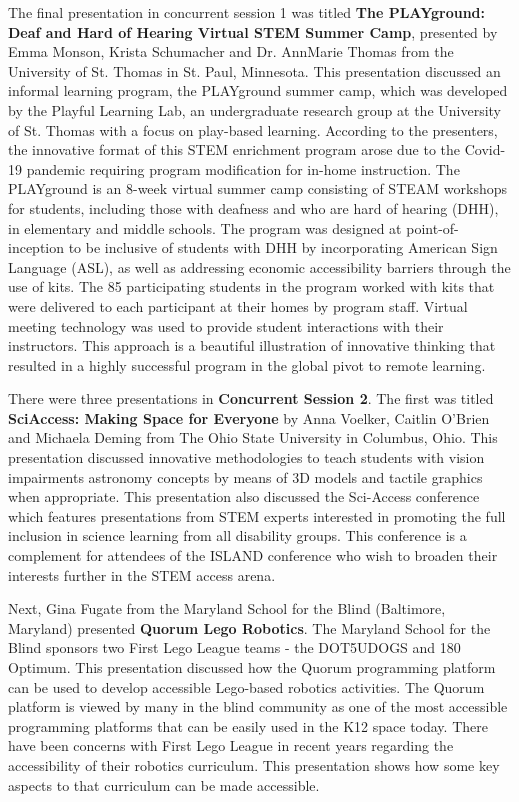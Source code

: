 \documentclass[11.5pt]{sig-alternate}
\begin{document}
\begin{large}
The final presentation in concurrent session 1 was titled \textbf{The PLAYground: Deaf and Hard of Hearing Virtual STEM Summer Camp}, presented by Emma Monson, Krista Schumacher and Dr. AnnMarie Thomas from the University of St. Thomas in St. Paul, Minnesota. This presentation discussed an informal learning program, the PLAYground summer camp, which was developed by the Playful Learning Lab, an undergraduate research group at the University of St. Thomas with a focus on play-based learning. According to the presenters, the innovative format of this STEM enrichment program arose due to the Covid-19 pandemic requiring program modification for in-home instruction. The PLAYground is an 8-week virtual summer camp consisting of STEAM workshops for students, including those with deafness and who are hard of hearing (DHH), in elementary and middle schools. The program was designed at point-of-inception to be inclusive of students with DHH by incorporating American Sign Language (ASL), as well as addressing economic accessibility barriers through the use of kits. The 85 participating students in the program worked with kits that were delivered to each participant at their homes by program staff. Virtual meeting technology was used to provide student interactions with their instructors. This approach is a beautiful illustration of innovative thinking that resulted in a highly successful program in the global pivot to remote learning. 

There were three presentations in \textbf{Concurrent Session 2}. The first was titled \textbf{SciAccess: Making Space for Everyone} by Anna Voelker, Caitlin O’Brien and Michaela Deming from The Ohio State University in Columbus, Ohio. This presentation discussed innovative methodologies to teach students with vision impairments astronomy concepts by means of 3D models and tactile graphics when appropriate. This presentation also discussed the Sci-Access conference which features presentations from STEM experts interested in promoting the full inclusion in science learning from all disability groups. This conference is a complement for attendees of the ISLAND conference who wish to broaden their interests further in the STEM access arena.

Next, Gina Fugate from the Maryland School for the Blind (Baltimore, Maryland) presented \textbf{Quorum Lego Robotics}. The Maryland School for the Blind sponsors two First Lego League teams - the DOT5UDOGS and 180 Optimum. This presentation discussed how the Quorum programming platform can be used to develop accessible Lego-based robotics activities. The Quorum platform is viewed by many in the blind community as one of the most accessible programming platforms that can be easily used in the K12 space today. There have been concerns with First Lego League in recent years regarding the accessibility of their robotics curriculum.  This presentation shows how some key aspects to that curriculum can be made accessible.


\end{large}
\end{document}
